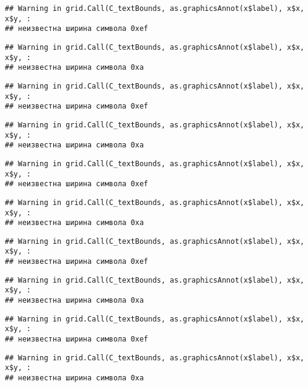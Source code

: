 \documentclass[
]{article}
\begin{document}
\begin{verbatim}
## Warning in grid.Call(C_textBounds, as.graphicsAnnot(x$label), x$x, x$y, :
## неизвестна ширина символа 0xef
\end{verbatim}

\begin{verbatim}
## Warning in grid.Call(C_textBounds, as.graphicsAnnot(x$label), x$x, x$y, :
## неизвестна ширина символа 0xa
\end{verbatim}

\begin{verbatim}
## Warning in grid.Call(C_textBounds, as.graphicsAnnot(x$label), x$x, x$y, :
## неизвестна ширина символа 0xef
\end{verbatim}

\begin{verbatim}
## Warning in grid.Call(C_textBounds, as.graphicsAnnot(x$label), x$x, x$y, :
## неизвестна ширина символа 0xa
\end{verbatim}

\begin{verbatim}
## Warning in grid.Call(C_textBounds, as.graphicsAnnot(x$label), x$x, x$y, :
## неизвестна ширина символа 0xef
\end{verbatim}

\begin{verbatim}
## Warning in grid.Call(C_textBounds, as.graphicsAnnot(x$label), x$x, x$y, :
## неизвестна ширина символа 0xa
\end{verbatim}

\begin{verbatim}
## Warning in grid.Call(C_textBounds, as.graphicsAnnot(x$label), x$x, x$y, :
## неизвестна ширина символа 0xef
\end{verbatim}

\begin{verbatim}
## Warning in grid.Call(C_textBounds, as.graphicsAnnot(x$label), x$x, x$y, :
## неизвестна ширина символа 0xa
\end{verbatim}

\begin{verbatim}
## Warning in grid.Call(C_textBounds, as.graphicsAnnot(x$label), x$x, x$y, :
## неизвестна ширина символа 0xef
\end{verbatim}

\begin{verbatim}
## Warning in grid.Call(C_textBounds, as.graphicsAnnot(x$label), x$x, x$y, :
## неизвестна ширина символа 0xa
\end{verbatim}
\end{document}
